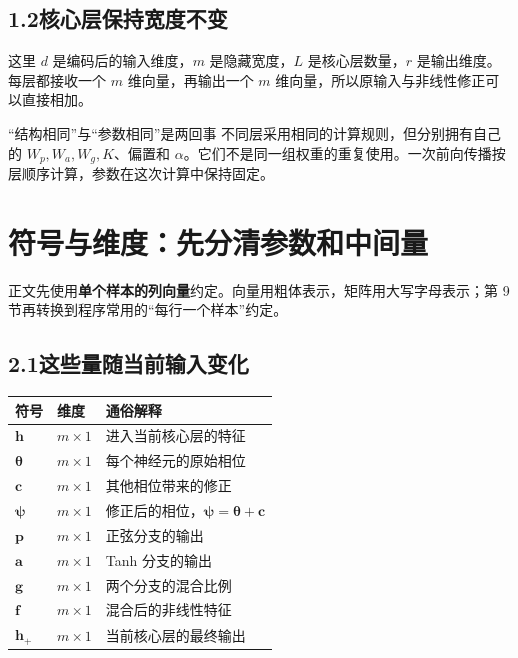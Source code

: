 \documentclass[UTF8,11pt,a4paper,fontset=fandol]{ctexart}
\newcommand{\newsection}[1]{\clearpage\section{#1}}
\begin{document}
\subsection*{1.2\quad 核心层保持宽度不变}
这里 $d$ 是编码后的输入维度，$m$ 是隐藏宽度，$L$ 是核心层数量，$r$ 是输出维度。每层都接收一个 $m$ 维向量，再输出一个 $m$ 维向量，所以原输入与非线性修正可以直接相加。
\begin{explain}{“结构相同”与“参数相同”是两回事}
不同层采用相同的计算规则，但分别拥有自己的 $W_p,W_a,W_g,K$、偏置和 $\alpha$。它们不是同一组权重的重复使用。一次前向传播按层顺序计算，参数在这次计算中保持固定。
\end{explain}

\newsection{符号与维度：先分清参数和中间量}
正文先使用\textbf{单个样本的列向量}约定。向量用粗体表示，矩阵用大写字母表示；第 9 节再转换到程序常用的“每行一个样本”约定。
\subsection*{2.1\quad 这些量随当前输入变化}
\par\smallskip\noindent\begin{tabularx}{\linewidth}{@{}p{22mm}p{22mm}Y@{}}
\toprule
\textbf{符号}&\textbf{维度}&\textbf{通俗解释}\\\midrule
$\boldsymbol{h}$&$m\times1$&进入当前核心层的特征\\
$\boldsymbol{\theta}$&$m\times1$&每个神经元的原始相位\\
$\boldsymbol{c}$&$m\times1$&其他相位带来的修正\\
$\boldsymbol{\psi}$&$m\times1$&修正后的相位，$\boldsymbol{\psi}=\boldsymbol{\theta}+\boldsymbol{c}$\\
$\boldsymbol{p}$&$m\times1$&正弦分支的输出\\
$\boldsymbol{a}$&$m\times1$&Tanh 分支的输出\\
$\boldsymbol{g}$&$m\times1$&两个分支的混合比例\\
$\boldsymbol{f}$&$m\times1$&混合后的非线性特征\\
$\boldsymbol{h}_{+}$&$m\times1$&当前核心层的最终输出\\\bottomrule
\end{tabularx}\par\smallskip
\end{document}
